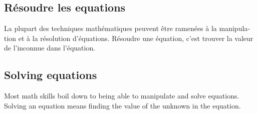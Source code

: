 
\vspace{0.2cm}


\vspace{0.3cm}

\begin{paracol}{2}

	\begin{leftcolumn*}

		\section{Résoudre les equations}
		\label{sec:solving_equations}

		\begin{otherlanguage}{french}
	La plupart des techniques mathématiques peuvent être ramenées à la manipulation et à la résolution d'équations.
	Résoudre une équation, c'est trouver la valeur de l'inconnue dans l'équation.


		\end{otherlanguage}

	\end{leftcolumn*}



	\begin{rightcolumn}

		\section{Solving equations}
		\label{sec:solving_equations}


	Most math skills boil down to being able to manipulate and solve equations. 
	Solving an equation means finding the value of the unknown in the equation.  



	\end{rightcolumn}

\end{paracol}

